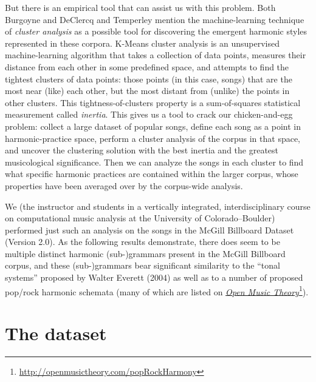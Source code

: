 But there is an empirical tool that can assist us with this problem. Both Burgoyne and DeClercq and Temperley mention the machine-learning technique of \emph{cluster analysis} as a possible tool for discovering the emergent harmonic styles represented in these corpora. K-Means cluster analysis is an unsupervised machine-learning algorithm that takes a collection of data points, measures their distance from each other in some predefined space, and attempts to find the tightest clusters of data points: those points (in this case, songs) that are the most near (like) each other, but the most distant from (unlike) the points in other clusters. This tightness-of-clusters property is a sum-of-squares statistical measurement called \emph{inertia}. This gives us a tool to crack our chicken-and-egg problem: collect a large dataset of popular songs, define each song as a point in harmonic-practice space, perform a cluster analysis of the corpus in that space, and uncover the clustering solution with the best inertia and the greatest musicological significance. Then we can analyze the songs in each cluster to find what specific harmonic practices are contained within the larger corpus, whose properties have been averaged over by the corpus-wide analysis.

We (the instructor and students in a vertically integrated, interdisciplinary course on computational music analysis at the University of Colorado–Boulder) performed just such an analysis on the songs in the McGill Billboard Dataset (Version 2.0). As the following results demonstrate, there does seem to be multiple distinct harmonic (sub-)grammars present in the McGill Billboard corpus, and these (sub-)grammars bear significant similarity to the ``tonal systems'' proposed by Walter Everett (2004) as well as to a number of proposed pop\slash rock harmonic schemata (many of which are listed on \href{http://openmusictheory.com/popRockHarmony}{\emph{Open Music Theory}}\footnote{\href{http://openmusictheory.com/popRockHarmony}{http:/\slash openmusictheory.com\slash popRockHarmony}}).

\chapter{The dataset}
\label{thedataset}

